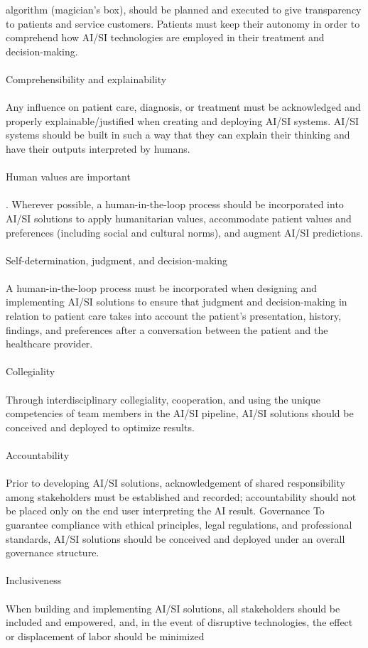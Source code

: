 \documentclass[12pt]{article}
\begin{document}
algorithm (magician's box), should be planned and executed to give transparency to patients and service
customers. Patients must keep their autonomy in order to comprehend how AI/SI technologies are employed in
their treatment and decision-making. \\\\Comprehensibility and explainability\\\\
Any influence on patient care, diagnosis, or treatment must be acknowledged and properly explainable/justified
when creating and deploying AI/SI systems. AI/SI systems should be built in such a way that they can explain
their thinking and have their outputs interpreted by humans.\\\\ Human values are important\\\\. Wherever possible, a human-in-the-loop process should be incorporated into AI/SI solutions to apply
humanitarian values, accommodate patient values and preferences (including social and cultural norms), and
augment AI/SI predictions. \\\\Self-determination, judgment, and decision-making\\\\
A human-in-the-loop process must be incorporated when designing and implementing AI/SI solutions to ensure
that judgment and decision-making in relation to patient care takes into account the patient's presentation, history, findings, and preferences after a conversation between the patient and the healthcare provider. \\\\Collegiality\\\\
Through interdisciplinary collegiality, cooperation, and using the unique competencies of team members in the
AI/SI pipeline, AI/SI solutions should be conceived and deployed to optimize results. \\\\Accountability\\\\
Prior to developing AI/SI solutions, acknowledgement of shared responsibility among stakeholders must be
established and recorded; accountability should not be placed only on the end user interpreting the AI result. Governance
To guarantee compliance with ethical principles, legal regulations, and professional standards, AI/SI solutions
should be conceived and deployed under an overall governance structure.\\\\
Inclusiveness\\\\
When building and implementing AI/SI solutions, all stakeholders should be included and empowered, and, in
the event of disruptive technologies, the effect or displacement of labor should be minimized\\ \\ 
\end{document}
